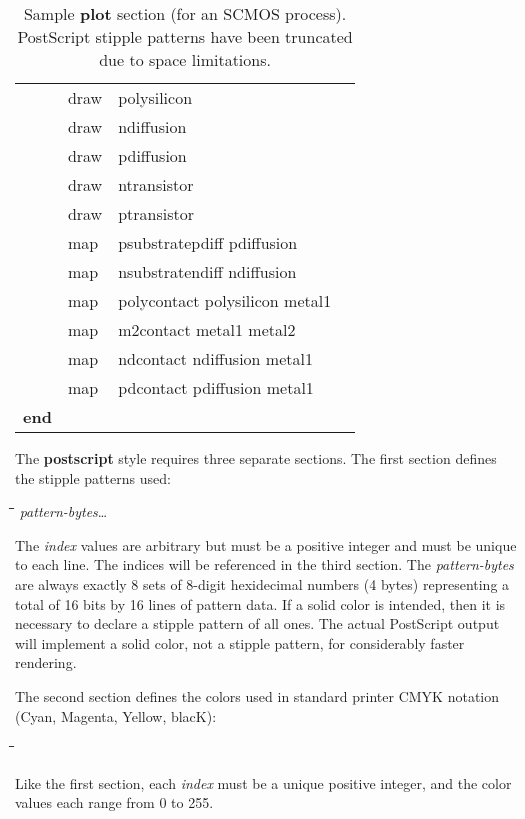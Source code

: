 \documentclass[letterpaper,twoside,12pt]{article}
\def\hinch{\hspace*{0.5in}}
\def\starti{\begin{center}\begin{tabbing}\hinch\=\hinch\=\hinch\=\hinch\=\kill}
\def\endi{\end{tabbing}\end{center}}
\def\ii{\>\>\>}
\begin{document}
\begin{table}[p]
\begin{center}
\begin{tabular}{|llll|}
&  draw & polysilicon & \\
&  draw & ndiffusion & \\
&  draw & pdiffusion & \\
&  draw & ntransistor & \\
&  draw & ptransistor & \\
&  map  & psubstratepdiff    pdiffusion & \\
&  map  & nsubstratendiff    ndiffusion & \\
&  map  & polycontact        polysilicon metal1 & \\
&  map  & m2contact          metal1 metal2 & \\
&  map  & ndcontact	     ndiffusion metal1 & \\
&  map  & pdcontact	     pdiffusion metal1 & \\

	{\bfseries end} &&& \\ \hline
      \end{tabular}
      \caption{Sample {\bfseries plot} section (for an SCMOS process).  PostScript
	stipple patterns have been truncated due to space limitations.}
   \end{center}
   \renewcommand{\baselinestretch}{1.0}
\end{table}

The {\bfseries postscript} style requires three separate sections.  The
first section defines the stipple patterns used:

\starti
   \ii {\itshape index} {\itshape pattern-bytes}\dots
\endi

The {\itshape index} values are arbitrary but must be a positive integer and
must be unique to each line.  The indices will be referenced in the third
section.  The {\itshape pattern-bytes} are always exactly 8 sets of 8-digit
hexidecimal numbers (4 bytes) representing a total of 16 bits by 16 lines of
pattern data.  If a solid color is intended, then it is necessary to declare
a stipple pattern of all ones.  The actual PostScript output will implement
a solid color, not a stipple pattern, for considerably faster rendering.

The second section defines the colors used in standard printer CMYK notation
(Cyan, Magenta, Yellow, blacK):

\starti
   \ii {\itshape index C M Y K}
\endi

Like the first section, each {\itshape index} must be a unique positive
integer, and the color values each range from 0 to 255.
\end{document}
